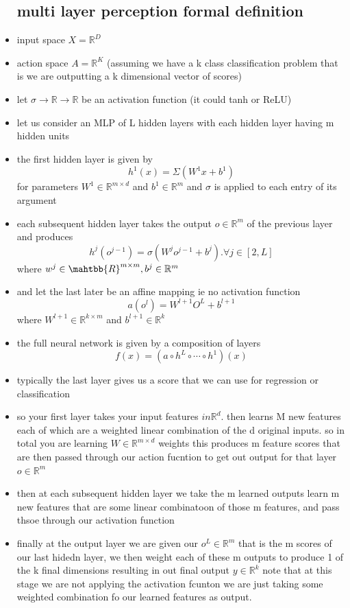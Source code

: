 \documentclass{article}
\begin{document}
\begin{itemize}
\subsection{multi layer perception formal definition}
\item input space $X=\mathbb{R}^D$
\item action space $A=\mathbb{R}^K$ (assuming we have a k class classification problem that is we are outputting a k dimensional vector of scores)
\item let $\sigma \rightarrow \mathbb{R}\rightarrow \mathbb{R}$ be an activation function (it could tanh or ReLU)
\item let us consider an MLP of L hidden layers with each hidden layer having m hidden units 
\item the first hidden layer is given by $$h^{1}(x)=\Sigma(W^1x+b^1)$$
for parameters $W^1\in \mathbb{R}^{m\times d}$ and $b^1\in \mathbb{R}^m$ and $\sigma$ is applied to each entry of its argument 
\item each subsequent hidden layer takes the output $o\in \mathbb{R}^m$ of the previous layer and produces $$h^{j}(o^{j-1})=\sigma(W^jo^{j-1}+b^j). \forall j \in [2,L]$$ where $w^{j}\in \mahtbb{R}^{m\times m}, b^j\in \mathbb{R}^m$
\item and let the last later be an affine mapping ie no activation function $$a(o^l)=W^{l+1}O^L+b^{l+1}$$ where $W^{l+1}\in \mathbb{R}^{k\times m}$ and $b^{l+1}\in \mathbb{R}^{k}$
\item the full neural network is given by a composition of layers $$f(x)=(a\circ h^L\circ \cdots \circ h^1)(x)$$
\item typically the last layer gives us a score that we can use for regression or classification 
\item so your first layer takes your input features $in \mathbb{R}^{d}$. then learns M new features each of which are a weighted linear combination of the d original inputs. so in total you are learning $W\in \mathbb{R}^{m\times d}$ weights this produces m feature scores that are then passed through our action fucntion to get out output for that layer $o\in \mathbb{R}^m$
\item then at each subsequent hidden layer we take the m learned outputs learn m new features that are some linear combinatoon of those m features, and pass thsoe through our activation function 
\item finally at the output layer we are given our $o^{L}\in \mathbb{R}^m$ that is the m scores of our last hidedn layer, we then weight each of these m outputs to produce 1 of the k final dimensions resulting in out final output $y\in \mathbb{R}^{k}$ note that at this stage we are not applying the activation fcunton we are just taking some weighted combination fo our learned features as output. 

\end{itemize}
\end{document}
